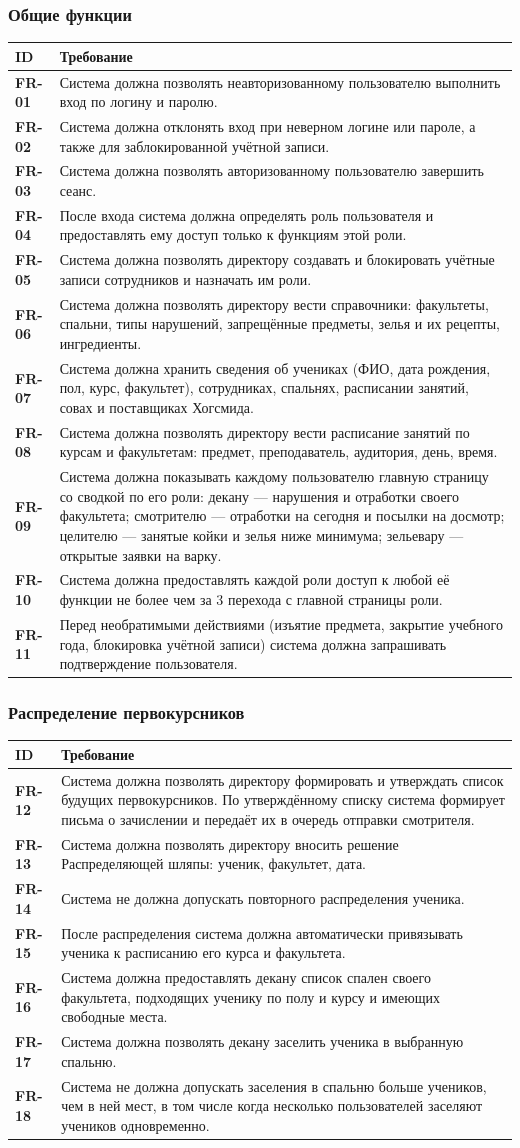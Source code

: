 \documentclass[a4paper,12pt]{article}
\newcommand{\req}[2]{\textbf{#1} & #2 \\ \hline}
\newenvironment{reqtable}{%
  \begin{longtable}{|>{\raggedright\arraybackslash}p{19mm}|>{\raggedright\arraybackslash}p{137mm}|}
  \hline
  \rowcolor{black!8}\textbf{ID} & \textbf{Требование} \\ \hline
  \endhead}{\end{longtable}}
\begin{document}
 
\subsubsection{Общие функции}
\begin{reqtable}
\req{FR-01}{Система должна позволять неавторизованному пользователю выполнить вход по логину и паролю.}
\req{FR-02}{Система должна отклонять вход при неверном логине или пароле, а также для заблокированной учётной записи.}
\req{FR-03}{Система должна позволять авторизованному пользователю завершить сеанс.}
\req{FR-04}{После входа система должна определять роль пользователя и предоставлять ему доступ только к функциям этой роли.}
\req{FR-05}{Система должна позволять директору создавать и блокировать учётные записи сотрудников и назначать им роли.}
\req{FR-06}{Система должна позволять директору вести справочники: факультеты, спальни, типы нарушений, запрещённые предметы, зелья и их рецепты, ингредиенты.}
\req{FR-07}{Система должна хранить сведения об учениках (ФИО, дата рождения, пол, курс, факультет), сотрудниках, спальнях, расписании занятий, совах и поставщиках Хогсмида.}
\req{FR-08}{Система должна позволять директору вести расписание занятий по курсам и факультетам: предмет, преподаватель, аудитория, день, время.}
\req{FR-09}{Система должна показывать каждому пользователю главную страницу со сводкой по его роли: декану — нарушения и отработки своего факультета; смотрителю — отработки на сегодня и посылки на досмотр; целителю — занятые койки и зелья ниже минимума; зельевару — открытые заявки на варку.}
\req{FR-10}{Система должна предоставлять каждой роли доступ к любой её функции не более чем за 3 перехода с главной страницы роли.}
\req{FR-11}{Перед необратимыми действиями (изъятие предмета, закрытие учебного года, блокировка учётной записи) система должна запрашивать подтверждение пользователя.}
\end{reqtable}
 
\subsubsection{Распределение первокурсников}
\begin{reqtable}
\req{FR-12}{Система должна позволять директору формировать и утверждать список будущих первокурсников. По утверждённому списку система формирует письма о зачислении и передаёт их в очередь отправки смотрителя.}
\req{FR-13}{Система должна позволять директору вносить решение Распределяющей шляпы: ученик, факультет, дата.}
\req{FR-14}{Система не должна допускать повторного распределения ученика.}
\req{FR-15}{После распределения система должна автоматически привязывать ученика к расписанию его курса и факультета.}
\req{FR-16}{Система должна предоставлять декану список спален своего факультета, подходящих ученику по полу и курсу и имеющих свободные места.}
\req{FR-17}{Система должна позволять декану заселить ученика в выбранную спальню.}
\req{FR-18}{Система не должна допускать заселения в спальню больше учеников, чем в ней мест, в том числе когда несколько пользователей заселяют учеников одновременно.}
\end{reqtable}
 
\end{document}
